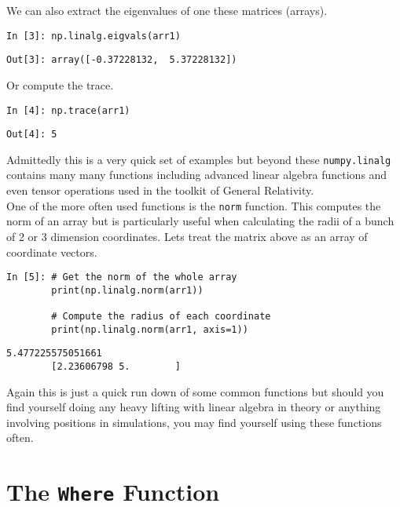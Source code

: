 We can also extract the eigenvalues of one these matrices (arrays).

\begin{lstlisting}[style=PY]
In [3]: np.linalg.eigvals(arr1)
\end{lstlisting}
\begin{lstlisting}[style=PY, backgroundcolor=\color{white}]
Out[3]: array([-0.37228132,  5.37228132])
\end{lstlisting}

Or compute the trace.

\begin{lstlisting}[style=PY]
In [4]: np.trace(arr1)
\end{lstlisting}
\begin{lstlisting}[style=PY, backgroundcolor=\color{white}]
Out[4]: 5
\end{lstlisting}

Admittedly this is a very quick set of examples but beyond these \texttt{numpy.linalg} contains many many functions including advanced linear algebra functions and even tensor operations used in the toolkit of General Relativity. \\

One of the more often used functions is the \texttt{norm} function. This computes the norm of an array but is particularly useful when calculating the radii of a bunch of 2 or 3 dimension coordinates. Lets treat the matrix above as an array of coordinate vectors.

\begin{lstlisting}[style=PY]
In [5]: # Get the norm of the whole array
        print(np.linalg.norm(arr1))
        
        # Compute the radius of each coordinate
        print(np.linalg.norm(arr1, axis=1))
\end{lstlisting}
\begin{lstlisting}[style=PY, backgroundcolor=\color{white}]
        5.477225575051661
        [2.23606798 5.        ]
\end{lstlisting}

Again this is just a quick run down of some common functions but should you find yourself doing any heavy lifting with linear algebra in theory or anything involving positions in simulations, you may find yourself using these functions often.

\section{The \texttt{Where} Function}

